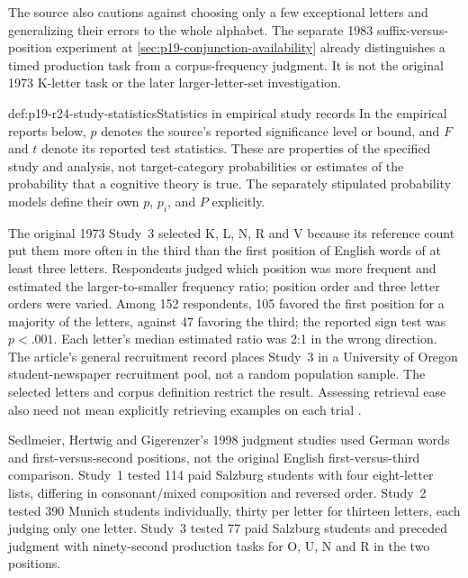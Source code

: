 The source also cautions against choosing only a few exceptional letters
and generalizing their errors to the whole alphabet. The separate 1983
suffix-versus-position experiment at
\cref{sec:p19-conjunction-availability} already distinguishes a timed
production task from a corpus-frequency judgment. It is not the original
1973 K-letter task or the later larger-letter-set investigation.

\begin{hbconvention}{def:p19-r24-study-statistics}{Statistics in empirical study records}
In the empirical reports below, \(p\) denotes the source's reported
significance level or bound, and \(F\) and \(t\) denote its reported test
statistics. These are properties of the specified study and analysis,
not target-category probabilities or estimates of the probability that
a cognitive theory is true. The separately stipulated probability models
define their own \(p\), \(p_i\), and \(P\) explicitly.
\end{hbconvention}

The original 1973 Study~3 selected K, L, N, R and V because its reference
count put them more often in the third than the first position of English
words of at least three letters. Respondents judged which position was
more frequent and estimated the larger-to-smaller frequency ratio;
position order and three letter orders were varied. Among 152 respondents,
105 favored the first position for a majority of the letters, against 47
favoring the third; the reported sign test was \(p<.001\). Each letter's
median estimated ratio was 2:1 in the wrong direction. The article's
general recruitment record places Study~3 in a University of Oregon
student-newspaper recruitment pool, not a random population sample.
The selected letters and corpus definition restrict the result. Assessing
retrieval ease also need not mean explicitly retrieving examples on each
trial \cite[pp.~208--209,211--212]{TverskyKahneman1973Availability}.

Sedlmeier, Hertwig and Gigerenzer's 1998 judgment studies used
German words and first-versus-second positions, not the original
English first-versus-third comparison. Study~1 tested 114 paid
Salzburg students with four eight-letter lists, differing in
consonant/mixed composition and reversed order. Study~2 tested
390 Munich students individually, thirty per letter for thirteen
letters, each judging only one letter. Study~3 tested 77 paid
Salzburg students and preceded judgment with ninety-second
production tasks for O, U, N and R in the two positions.

